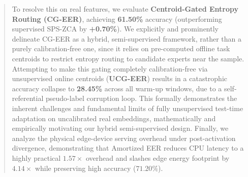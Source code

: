 \begin{abstract}
To resolve this on real features, we evaluate \textbf{Centroid-Gated Entropy Routing (CG-EER)}, achieving \textbf{61.50\%} accuracy (outperforming supervised SPS-ZCA by \textbf{+0.70\%}). We explicitly and prominently delineate CG-EER as a hybrid, semi-supervised framework, rather than a purely calibration-free one, since it relies on pre-computed offline task centroids to restrict entropy routing to candidate experts near the sample. Attempting to make this gating completely calibration-free via unsupervised online centroids (\textbf{UCG-EER}) results in a catastrophic accuracy collapse to \textbf{28.45\%} across all warm-up windows, due to a self-referential pseudo-label corruption loop. This formally demonstrates the inherent challenges and fundamental limits of fully unsupervised test-time adaptation on uncalibrated real embeddings, mathematically and empirically motivating our hybrid semi-supervised design. Finally, we analyze the physical edge-device serving overhead under post-activation divergence, demonstrating that Amortized EER reduces CPU latency to a highly practical $1.57\times$ overhead and slashes edge energy footprint by $4.14\times$ while preserving high accuracy ($71.20\%$).
\end{abstract}